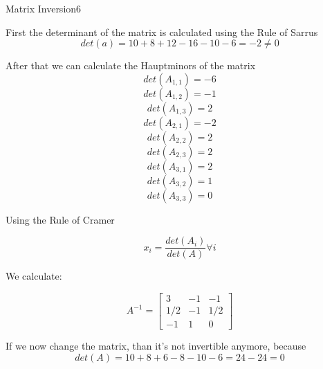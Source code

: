 \begin{questions}
\begin{question}{Matrix Inversion}{6}
\begin{answer}
	
	First the determinant of the matrix is calculated using the Rule of Sarrus
\begin{equation}
	det(a) = 10 + 8 +12 -16 - 10 - 6 = -2 \neq 0
\end{equation}

After that we can calculate the Hauptminors of the matrix
\begin{equation}
det(A_{1,1}) = -6
\end{equation}
\begin{equation}
det(A_{1,2}) = -1
\end{equation}
\begin{equation}
det(A_{1,3}) = 2
\end{equation}
\begin{equation}
det(A_{2,1}) = -2
\end{equation}
\begin{equation}
det(A_{2,2}) = 2
\end{equation}
\begin{equation}
det(A_{2,3}) = 2
\end{equation}
\begin{equation}
det(A_{3,1}) = 2
\end{equation}
\begin{equation}
det(A_{3,2}) = 1
\end{equation}
\begin{equation}
det(A_{3,3}) = 0
\end{equation}

Using the Rule of Cramer

\begin{equation}
	x_i = \frac{det(A_i)}{det(A)} \forall i
\end{equation}

We calculate: 

\begin{equation}
A^{-1} = 
\begin{bmatrix}
	3 & -1 & -1  \\
	1/2 & -1 & 1/2 \\
	-1 & 1 & 0
\end{bmatrix}
\end{equation}

If we now change the matrix, than it's not invertible anymore, because
\begin{equation}
	det(A) = 10 + 8 + 6 - 8- 10 - 6 = 24 - 24 = 0 
\end{equation}



\end{answer}
\end{question}
\end{questions}
